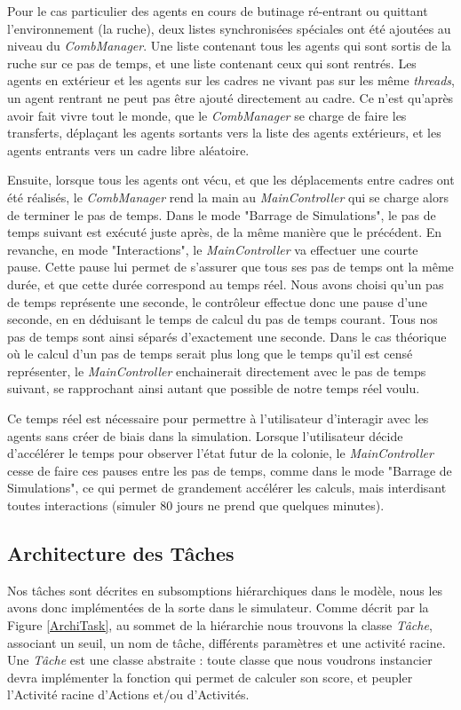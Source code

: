 			Pour le cas particulier des agents en cours de butinage ré-entrant ou quittant l'environnement (la ruche), deux listes synchronisées spéciales ont été ajoutées au niveau du \textit{CombManager}. Une liste contenant tous les agents qui sont sortis de la ruche sur ce pas de temps, et une liste contenant ceux qui sont rentrés. Les agents en extérieur et les agents sur les cadres ne vivant pas sur les même \textit{threads}, un agent rentrant ne peut pas être ajouté directement au cadre. Ce n'est qu'après avoir fait vivre tout le monde, que le \textit{CombManager} se charge de faire les transferts, déplaçant les agents sortants vers la liste des agents extérieurs, et les agents entrants vers un cadre libre aléatoire.
			
			Ensuite, lorsque tous les agents ont vécu, et que les déplacements entre cadres ont été réalisés, le \textit{CombManager} rend la main au \textit{MainController} qui se charge alors de terminer le pas de temps. Dans le mode "Barrage de Simulations", le pas de temps suivant est exécuté juste après, de la même manière que le précédent. En revanche, en mode "Interactions", le \textit{MainController} va effectuer une courte pause. Cette pause lui permet de s'assurer que tous ses pas de temps ont la même durée, et que cette durée correspond au temps réel. Nous avons choisi qu'un pas de temps représente une seconde, le contrôleur effectue donc une pause d'une seconde, en en déduisant le temps de calcul du pas de temps courant. Tous nos pas de temps sont ainsi séparés d'exactement une seconde. Dans le cas théorique où le calcul d'un pas de temps serait plus long que le temps qu'il est censé représenter, le \textit{MainController} enchainerait directement avec le pas de temps suivant, se rapprochant ainsi autant que possible de notre temps réel voulu.
			
			Ce temps réel est nécessaire pour permettre à l'utilisateur d'interagir avec les agents sans créer de biais dans la simulation. Lorsque l'utilisateur décide d'accélérer le temps pour observer l'état futur de la colonie, le \textit{MainController} cesse de faire ces pauses entre les pas de temps, comme dans le mode "Barrage de Simulations", ce qui permet de grandement accélérer les calculs, mais interdisant toutes interactions (simuler 80 jours ne prend que quelques minutes).
			
			\subsection{Architecture des Tâches}
			\label{subsectionImplemTasks}
			Nos tâches sont décrites en subsomptions hiérarchiques dans le modèle, nous les avons donc implémentées de la sorte dans le simulateur. Comme décrit par la Figure \ref{ArchiTask}, au sommet de la hiérarchie nous trouvons la classe \textit{Tâche}, associant un seuil, un nom de tâche, différents paramètres et une activité racine. Une \textit{Tâche} est une classe abstraite : toute classe que nous voudrons instancier devra implémenter la fonction qui permet de calculer son score, et peupler l'Activité racine d'Actions et/ou d'Activités.
			
